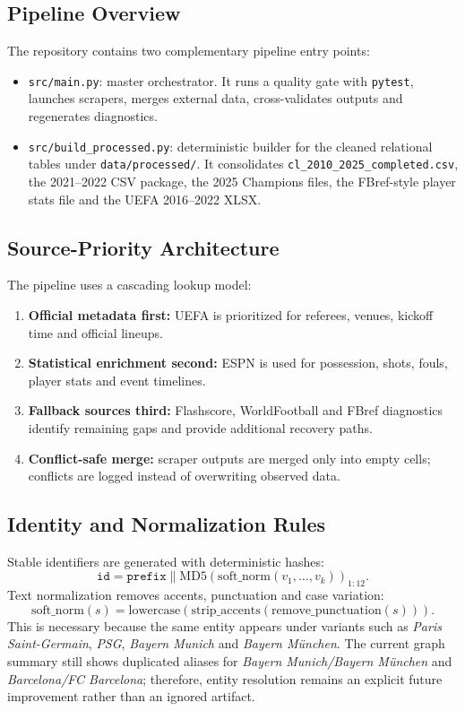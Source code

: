 \documentclass[12pt,a4paper]{article}
\begin{document}
\subsection{Pipeline Overview}
The repository contains two complementary pipeline entry points:
\begin{itemize}
    \item \texttt{src/main.py}: master orchestrator. It runs a quality gate with \texttt{pytest}, launches scrapers, merges external data, cross-validates outputs and regenerates diagnostics.
    \item \texttt{src/build\_processed.py}: deterministic builder for the cleaned relational tables under \texttt{data/processed/}. It consolidates \texttt{cl\_2010\_2025\_completed.csv}, the 2021--2022 CSV package, the 2025 Champions files, the FBref-style player stats file and the UEFA 2016--2022 XLSX.
\end{itemize}

\subsection{Source-Priority Architecture}
The pipeline uses a cascading lookup model:
\begin{enumerate}
    \item \textbf{Official metadata first:} UEFA is prioritized for referees, venues, kickoff time and official lineups.
    \item \textbf{Statistical enrichment second:} ESPN is used for possession, shots, fouls, player stats and event timelines.
    \item \textbf{Fallback sources third:} Flashscore, WorldFootball and FBref diagnostics identify remaining gaps and provide additional recovery paths.
    \item \textbf{Conflict-safe merge:} scraper outputs are merged only into empty cells; conflicts are logged instead of overwriting observed data.
\end{enumerate}

\subsection{Identity and Normalization Rules}
Stable identifiers are generated with deterministic hashes:
\begin{equation}
    \texttt{id} = \texttt{prefix} \parallel \mathrm{MD5}(\mathrm{soft\_norm}(v_1,\ldots,v_k))_{1:12}.
\end{equation}
Text normalization removes accents, punctuation and case variation:
\begin{equation}
    \mathrm{soft\_norm}(s)=\mathrm{lowercase}(\mathrm{strip\_accents}(\mathrm{remove\_punctuation}(s))).
\end{equation}
This is necessary because the same entity appears under variants such as \textit{Paris Saint-Germain}, \textit{PSG}, \textit{Bayern Munich} and \textit{Bayern München}. The current graph summary still shows duplicated aliases for \textit{Bayern Munich/Bayern München} and \textit{Barcelona/FC Barcelona}; therefore, entity resolution remains an explicit future improvement rather than an ignored artifact.
\end{document}
